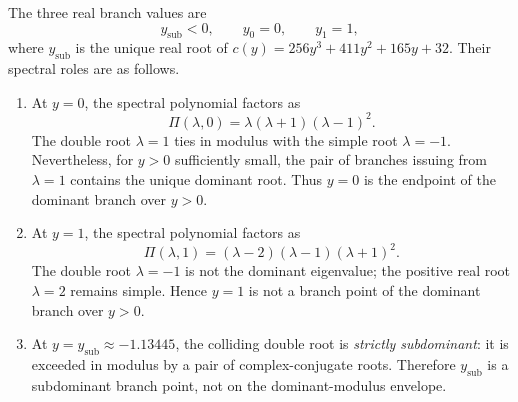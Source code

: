 \begin{theorem}\label{thm:ep-classification}
The three real branch values are
\[
y_{\mathrm{sub}} < 0, \qquad y_0 = 0, \qquad y_1 = 1,
\]
where $y_{\mathrm{sub}}$ is the unique real root of $c(y) = 256y^3 + 411y^2 + 165y + 32$.
Their spectral roles are as follows.
\begin{enumerate}
\item At $y = 0$, the spectral polynomial factors as
\[
\Pi(\lambda, 0) = \lambda(\lambda + 1)(\lambda - 1)^2.
\]
The double root $\lambda=1$ ties in modulus with the simple root $\lambda=-1$.
Nevertheless, for $y>0$ sufficiently small, the pair of branches issuing from $\lambda=1$ contains the unique dominant root.
Thus $y=0$ is the endpoint of the dominant branch over $y>0$.

\item At $y = 1$, the spectral polynomial factors as
\[
\Pi(\lambda, 1) = (\lambda - 2)(\lambda - 1)(\lambda + 1)^2.
\]
The double root $\lambda = -1$ is not the dominant eigenvalue; the positive real root $\lambda = 2$ remains simple.
Hence $y = 1$ is not a branch point of the dominant branch over $y>0$.

\item At $y = y_{\mathrm{sub}} \approx -1.13445$, the colliding double root is \emph{strictly subdominant}: it is exceeded in modulus by a pair of complex-conjugate roots.
Therefore $y_{\mathrm{sub}}$ is a subdominant branch point, not on the dominant-modulus envelope.
\end{enumerate}
\end{theorem}

